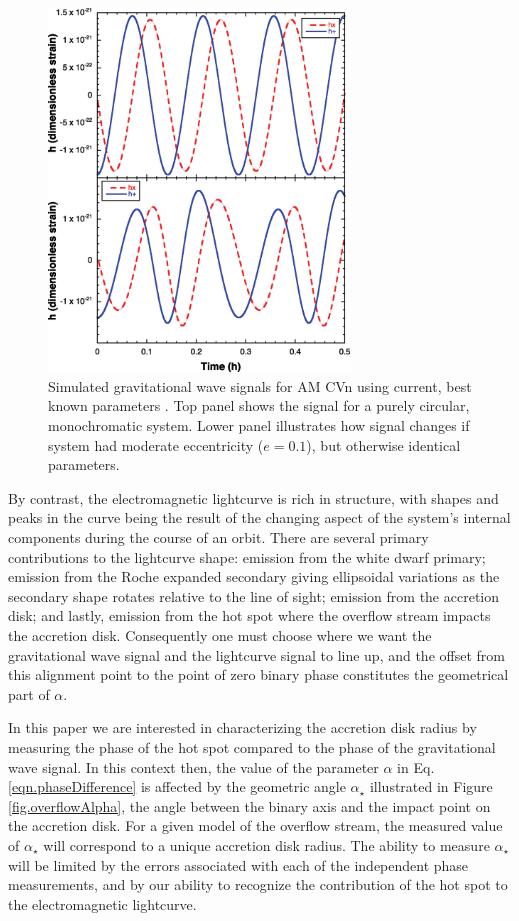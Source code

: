 \documentclass[preprint2]{aastex}
\begin{document}
\begin{figure}[t!]
  \centering
  \includegraphics[width=80mm]{./figs/plotAMCVn.eps} 
  \caption{{\small Simulated gravitational wave signals for AM CVn 
  using current, best known parameters \cite{NelemansWiki}.  Top 
  panel shows the signal for a purely circular, monochromatic system. 
  Lower panel illustrates how signal changes if system had moderate 
  eccentricity ($e = 0.1$), but otherwise identical parameters.}}
  \label{fig.gwSignals}
\end{figure}

By contrast, the electromagnetic lightcurve is rich in structure, 
with shapes and peaks in the curve being the result of the changing 
aspect of the system's internal components during the course of an 
orbit. There are several primary contributions to the lightcurve 
shape: emission from the white dwarf primary; emission from the Roche 
expanded secondary giving ellipsoidal variations as the secondary 
shape rotates relative to the line of sight; emission from the 
accretion disk; and lastly, emission from the hot spot where the 
overflow stream impacts the accretion disk. Consequently one must choose where we want the gravitational wave signal and the lightcurve signal to line up, and the offset from this alignment point to the point of zero binary phase constitutes the geometrical part of $\alpha$.

In this paper we are interested in characterizing the accretion disk radius
by measuring the phase of the hot spot compared to the phase of the
gravitational wave signal. In this context then, the value of the
parameter $\alpha$ in Eq. \ref{eqn.phaseDifference} is affected by the geometric angle $\alpha_{\star}$ illustrated in Figure
\ref{fig.overflowAlpha}, the angle between the binary axis and the
impact point on the accretion disk. For a given model of the overflow
stream, the measured value of $\alpha_{\star}$ will correspond to a unique
accretion disk radius.  The ability to measure $\alpha_{\star}$ will be
limited by the errors associated with each of the independent phase
measurements, and by our ability to recognize the contribution of the
hot spot to the electromagnetic lightcurve.
\end{document}
